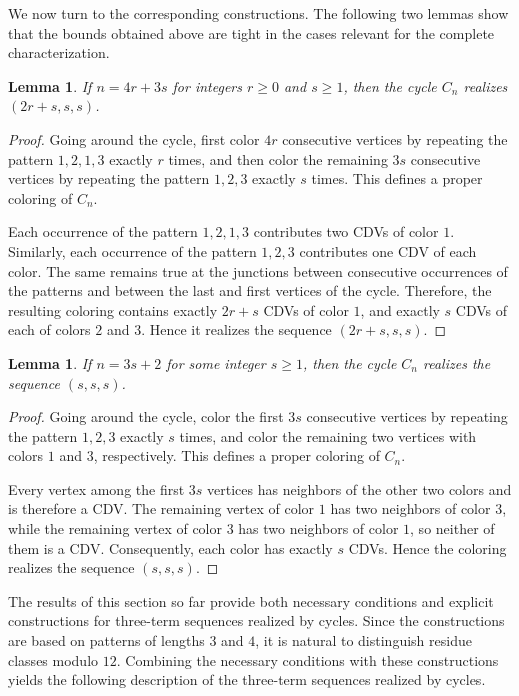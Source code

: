 \documentclass{article}
\newtheorem{lemma}[theorem]{Lemma}
\theoremstyle{definition}
\begin{document}
\medskip

We now turn to the corresponding constructions. The following two lemmas show that the bounds obtained above are tight in the cases relevant for the complete characterization.

\begin{lemma}\label{l:4r+3s,2r+sss}
If $n=4r+3s$ for integers $r\ge 0$ and $s\ge 1$, then the cycle $C_n$ realizes $(2r+s,s,s)$.
\end{lemma}
\begin{proof}
Going around the cycle, first color $4r$ consecutive vertices by repeating the pattern $1,2,1,3$ exactly $r$ times, and then color the remaining $3s$ consecutive vertices by repeating the pattern $1,2,3$
exactly $s$ times. This defines a proper coloring of $C_n$.

Each occurrence of the pattern $1,2,1,3$ contributes two CDVs of color $1$. Similarly, each occurrence of the pattern $1,2,3$ contributes one CDV of each color. The same remains true at the junctions between consecutive occurrences of the patterns and between the last and first vertices of the cycle. Therefore, the resulting coloring contains exactly $2r+s$ CDVs of color $1$, and exactly $s$ CDVs of each of colors $2$ and $3$. Hence it realizes the sequence $(2r+s,s,s)$.
\end{proof}

\medskip

\begin{lemma}\label{l:3k+2,kkk}
If $n=3s+2$ for some integer $s\geq1$, then the cycle $C_n$ realizes the sequence $(s,s,s)$.
\end{lemma}
\begin{proof}
Going around the cycle, color the first $3s$ consecutive vertices by repeating the pattern $1,2,3$ exactly $s$ times, and color the remaining two vertices with colors $1$ and $3$, respectively. This defines a proper coloring of $C_n$.

Every vertex among the first $3s$ vertices has neighbors of the other two colors and is therefore a CDV. The remaining vertex of color $1$ has two neighbors of color $3$, while the remaining vertex of color $3$ has two neighbors of color $1$, so neither of them is a CDV. Consequently, each color has exactly $s$ CDVs. Hence the coloring realizes the sequence $(s,s,s)$.
\end{proof}

\medskip

The results of this section so far provide both necessary conditions and explicit constructions for three-term sequences realized by cycles. Since the constructions are based on patterns of lengths $3$ and $4$, it is natural to distinguish residue classes modulo $12$. Combining the necessary conditions with these constructions yields the following description of the three-term sequences realized by cycles.
\end{document}
